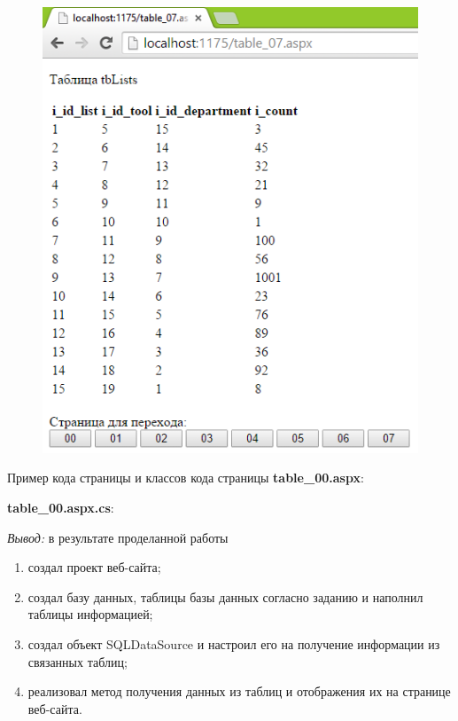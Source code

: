 \documentclass[pscyr]{hedlab}
\begin{document}
  \begin{figure}[h!]
    \center
    \includegraphics[width=.47\textwidth]{lab03_08}
  \end{figure}
  \clearpage
  
  Пример кода страницы и классов кода страницы \textbf{table\_00.aspx}:
  
  
  \vspace{2em}
  \textbf{table\_00.aspx.cs}:
  
  
  \emph{Вывод:} в результате проделанной работы
  \vspace{-.5em}  
  \begin{enumerate}
    \itemsep -5pt
    \item создал проект веб-сайта;
    \item создал базу данных, таблицы базы данных согласно заданию и
      наполнил таблицы информацией;
    \item создал объект SQLDataSource и настроил его на получение информации
      из связанных таблиц;
    \item реализовал метод получения данных из таблиц и отображения их на
      странице веб-сайта.
  \end{enumerate}
\end{document}
